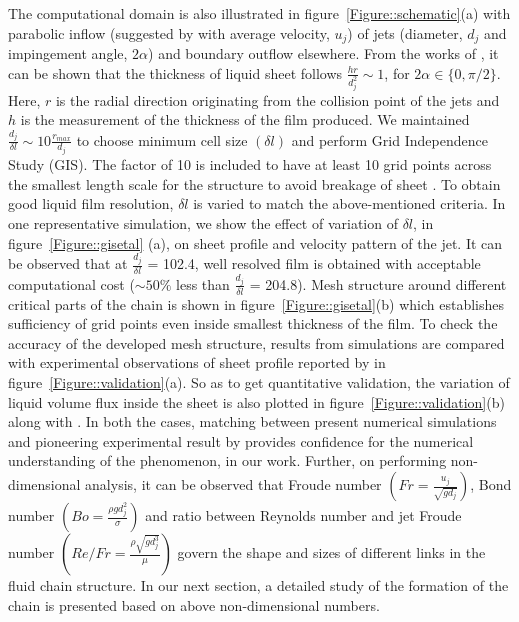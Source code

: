 \documentclass[%
 aip,
 sd,%
amsmath,amssymb,
preprint,%
author-year,%
]{revtex4-1}
\begin{document}
The computational domain is also illustrated in figure~\ref{Figure::schematic}(a) with parabolic inflow (suggested by \cite{choo2007effect} with average velocity, $u_j$) of jets (diameter, $d_j$ and impingement angle, $2\alpha$) and boundary outflow elsewhere. From the works of \cite{hasson1964thickness,choo2001parametric}, it can be shown that the thickness of liquid sheet follows $\frac{hr}{d_j^2} \sim 1$, for $2\alpha \in \{0,\pi/2\}$.  Here, $r$ is the radial direction originating from the collision point of the jets and $h$ is the measurement of the thickness of the film produced. We maintained $\frac{d_j}{\delta l} \sim 10\frac{r_{max}}{d_j}$ to choose minimum cell size $\left(\delta l\right)$ and perform Grid Independence Study (GIS). The factor of 10 is included to have at least {\color{red} 10 grid points \citep{ling2015multiscale}} across the smallest length scale for the structure to avoid breakage of sheet \citep{chen2013high}. To obtain {\color{red}good} liquid film {\color{red}resolution}, $\delta l$ is varied to match the above-mentioned criteria. In one representative simulation, we show the effect of variation of $\delta l$, in figure~\ref{Figure::gisetal} (a), on sheet profile and velocity pattern of the jet. It can be observed that at $\frac{d_j}{\delta l}$ = 102.4, well resolved film is obtained with acceptable computational cost ($\sim 50\%$ less than $\frac{d_j}{\delta l}$ = 204.8). Mesh structure around different critical parts of the chain is shown in figure~\ref{Figure::gisetal}(b) which establishes sufficiency of grid points even inside smallest thickness of the film. To check the accuracy of the developed mesh structure, results from simulations are compared with experimental observations of sheet profile reported by \cite{bush2004collision} in figure~\ref{Figure::validation}(a). So as to get quantitative validation, the variation of liquid volume flux inside the sheet is also plotted in figure~\ref{Figure::validation}(b) along with \cite{bush2004collision}. In both the cases, matching between present numerical simulations and pioneering experimental result by \cite{bush2004collision} provides confidence for the numerical understanding of the phenomenon, in our work. Further, on performing non-dimensional analysis, it can be observed that Froude number $\left(Fr = \frac{u_j}{\sqrt{gd_j}}\right)$, Bond number $\left(Bo = \frac{\rho gd_j^2}{\sigma}\right)$ and ratio between Reynolds number and jet Froude number $\left(Re/Fr = \frac{\rho\sqrt{gd_j^3}}{\mu}\right)$ govern the shape and sizes of different links in the fluid chain structure. In our next section, a detailed {\color{red}study of the} formation of the chain {\color{red}is presented} based on above non-dimensional numbers.
\end{document}
